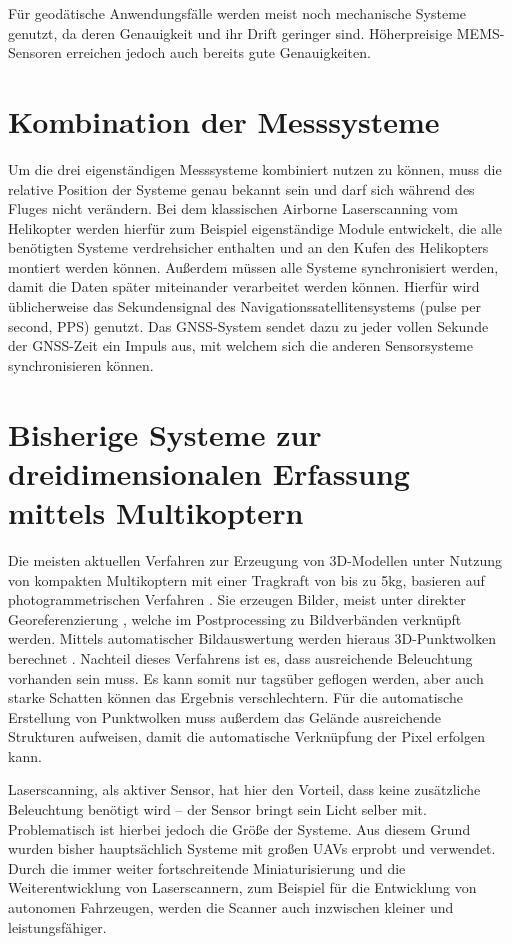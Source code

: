 \documentclass[a4paper,12pt,bibliography=totoc, listof=totoc,titlepage,pointlessnumbers]{scrreprt}
\begin{document}
Für geodätische Anwendungsfälle werden meist noch mechanische Systeme genutzt, da deren Genauigkeit und ihr Drift geringer sind. Höherpreisige MEMS-Sensoren erreichen jedoch auch bereits gute Genauigkeiten. \citep{imar}

\section{Kombination der Messsysteme}
Um die drei eigenständigen Messsysteme kombiniert nutzen zu können, muss die relative Position der Systeme genau bekannt sein und darf sich während des Fluges nicht verändern. Bei dem klassischen Air\-borne Laser\-scan\-ning vom Helikopter werden hierfür zum Beispiel eigenständige Module entwickelt, die alle benötigten Systeme verdrehsicher enthalten und an den Kufen des Helikopters montiert werden können. Außerdem müssen alle Systeme synchronisiert werden, damit die Daten später miteinander verarbeitet werden können. Hierfür wird üblicherweise das Sekundensignal des Navigationssatellitensystems (pulse per second, PPS) genutzt. Das GNSS-System sendet dazu zu jeder vollen Sekunde der GNSS-Zeit ein Impuls aus, mit welchem sich die anderen Sensorsysteme synchronisieren können. \citep[S. 23f]{beraldin}

\section{Bisherige Systeme zur dreidimensionalen Erfassung mittels Multikoptern}
Die meisten aktuellen Verfahren zur Erzeugung von 3D-Modellen unter Nutzung von kompakten Multikoptern mit einer Tragkraft von bis zu 5kg, basieren auf photogrammetrischen Verfahren \citep{carlos}. Sie erzeugen Bilder, meist unter direkter Georeferenzierung \cite[S. 16f]{uav}, welche im Postprocessing zu Bildverbänden verknüpft werden. Mittels automatischer Bildauswertung werden hieraus 3D-Punktwolken berechnet \cite[S. 18f]{uav}. Nachteil dieses Verfahrens ist es, dass ausreichende Beleuchtung vorhanden sein muss. Es kann somit nur tagsüber geflogen werden, aber auch starke Schatten können das Ergebnis verschlechtern. Für die automatische Erstellung von Punktwolken muss außerdem das Gelände ausreichende Strukturen aufweisen, damit die automatische Verknüpfung der Pixel erfolgen kann.

Laser\-scan\-ning, als aktiver Sensor, hat hier den Vorteil, dass keine zu\-sätz\-liche Beleuchtung benötigt wird -- der Sensor bringt sein Licht selber mit. Problematisch ist hierbei jedoch die Größe der Systeme. Aus diesem Grund wurden bisher haupt\-säch\-lich Systeme mit großen UAVs erprobt und verwendet. Durch die immer weiter fortschreitende Miniaturisierung und die Weiterentwicklung von Laser\-scan\-nern, zum Beispiel für die Entwicklung von autonomen Fahrzeugen, werden die Scanner auch inzwischen kleiner und leistungsfähiger. \citep[S. 19]{uav}
\end{document}
